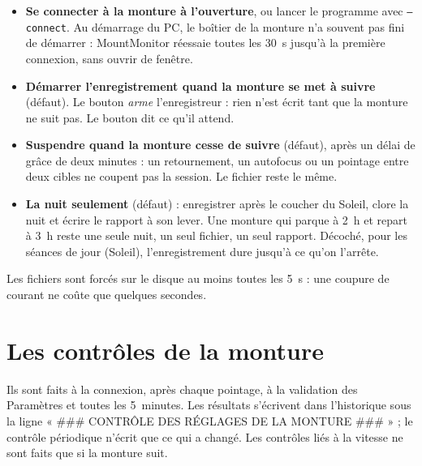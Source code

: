 \begin{itemize}
  \item \textbf{Se connecter à la monture à l'ouverture}, ou lancer le
  programme avec \texttt{--connect}. Au démarrage du PC, le boîtier de la
  monture n'a souvent pas fini de démarrer : MountMonitor réessaie toutes les
  30~s jusqu'à la première connexion, sans ouvrir de fenêtre.
  \item \textbf{Démarrer l'enregistrement quand la monture se met à suivre}
  (défaut). Le bouton \emph{arme} l'enregistreur : rien n'est écrit tant que la
  monture ne suit pas. Le bouton dit ce qu'il attend.
  \item \textbf{Suspendre quand la monture cesse de suivre} (défaut), après un
  délai de grâce de deux minutes : un retournement, un autofocus ou un pointage
  entre deux cibles ne coupent pas la session. Le fichier reste le même.
  \item \textbf{La nuit seulement} (défaut) : enregistrer après le coucher du
  Soleil, clore la nuit et écrire le rapport à son lever. Une monture qui parque
  à 2~h et repart à 3~h reste une seule nuit, un seul fichier, un seul rapport.
  Décoché, pour les séances de jour (Soleil), l'enregistrement dure jusqu'à ce
  qu'on l'arrête.
\end{itemize}

Les fichiers sont forcés sur le disque au moins toutes les 5~s : une coupure de
courant ne coûte que quelques secondes.

\chapter{Les contrôles de la monture}
\label{ch:checks}

Ils sont faits à la connexion, après chaque pointage, à la validation des
Paramètres et toutes les 5~minutes. Les résultats s'écrivent dans l'historique
sous la ligne « \#\#\# CONTRÔLE DES RÉGLAGES DE LA MONTURE \#\#\# » ; le
contrôle périodique n'écrit que ce qui a changé. Les contrôles liés à la vitesse
ne sont faits que si la monture suit.

